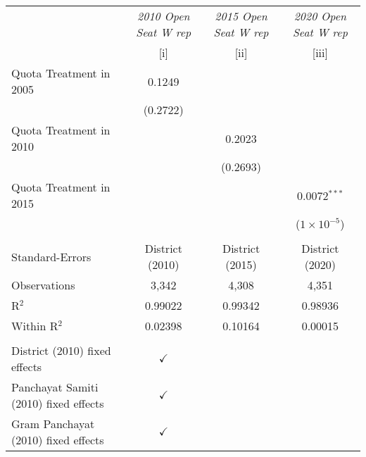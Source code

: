 
\begingroup
\centering
\begin{tabular}{lccc}
   \toprule
                                         & \textit{2010 Open Seat W rep}  & \textit{2015 Open Seat W rep}  & \textit{2020 Open Seat W rep}\\   
                                         & [i]                            & [ii]                           & [iii]\\  
   \midrule 
   Quota Treatment in 2005               & 0.1249                         &                                &   \\   
                                         & (0.2722)                       &                                &   \\   
   Quota Treatment in 2010               &                                & 0.2023                         &   \\   
                                         &                                & (0.2693)                       &   \\   
   Quota Treatment in 2015               &                                &                                & 0.0072$^{***}$\\   
                                         &                                &                                & ($1\times 10^{-5}$)\\    
    \\
   Standard-Errors                       & District (2010)                & District (2015)                & District (2020) \\   
   Observations                          & 3,342                          & 4,308                          & 4,351\\  
   R$^2$                                 & 0.99022                        & 0.99342                        & 0.98936\\  
   Within R$^2$                          & 0.02398                        & 0.10164                        & 0.00015\\  
    \\
   District (2010) fixed effects         & $\checkmark$                   &                                & \\  
   Panchayat Samiti (2010) fixed effects & $\checkmark$                   &                                & \\  
   Gram Panchayat (2010) fixed effects   & $\checkmark$                   &                                & \\  

\end{tabular}
